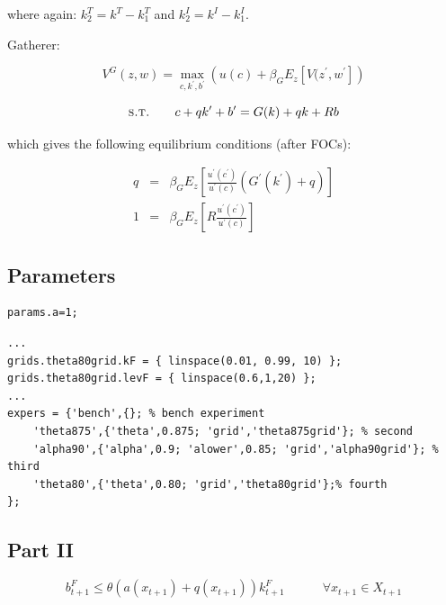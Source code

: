 \documentclass{article}
\begin{document}
where again: $ k_2^T = k^T - k_1^T$ and  $ k_2^I = k^I - k_1^I$.












Gatherer:

$$ V^G(z,w) = \max_{c,k^{\prime},b^{\prime} } \left( u(c) + \beta_G E_z \left[ V(z^{\prime},w^{\prime} \right]  \right) $$

$$ \textsc{s.t.} \quad \quad c+qk^\prime+b^\prime = G(k) + qk +Rb$$

which gives the following equilibrium conditions (after FOCs):

\begin{eqnarray*}
 q & = & \beta_G E_z\left[ \frac{u^\prime(c^\prime)}{u^\prime(c)}\left(G^\prime(k^\prime)+q\right)\right]\\
 1 & = & \beta_G E_z\left[R\frac{u^\prime(c^\prime)}{u^\prime(c)}\right]
\end{eqnarray*}


\subsection*{Parameters}


\begin{verbatim}
params.a=1;

\end{verbatim}



\color{lightgray} \begin{verbatim} 
...
grids.theta80grid.kF = { linspace(0.01, 0.99, 10) };
grids.theta80grid.levF = { linspace(0.6,1,20) };
...
expers = {'bench',{}; % bench experiment
    'theta875',{'theta',0.875; 'grid','theta875grid'}; % second
    'alpha90',{'alpha',0.9; 'alower',0.85; 'grid','alpha90grid'}; % third
    'theta80',{'theta',0.80; 'grid','theta80grid'};% fourth
};

\end{verbatim} \color{black}




\subsection*{Part II}

$$b_{t+1}^F \leq \theta \left( a(x_{t+1}) + q(x_{t+1}) \right)k_{t+1}^F  \quad \quad \quad \forall x_{t+1} \in X_{t+1} $$
\end{document}
